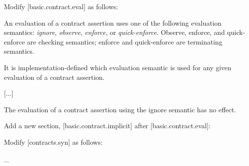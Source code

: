 Modify [basic.contract.eval] as follows:

\begin{adjustwidth}{0.5cm}{0.5cm}
An evaluation of a contract assertion uses one of the following  evaluation semantics: 
\emph{ignore}, 
\emph{observe}, 
\emph{enforce}, or 
\emph{quick-enforce}. 
Observe, enforce, and quick-enforce are checking semantics; enforce and quick-enforce are terminating semantics.

It is implementation-defined which evaluation semantic is used for any given evaluation of a contract assertion.  


[...]

The evaluation of a contract assertion using the ignore  semantic has no effect. 


\end{adjustwidth}

Add a new section, [basic.contract.implicit] after [basic.contract.eval]:

\begin{adjustwidth}{0.5cm}{0.5cm}

\end{adjustwidth}

Modify [contracts.syn] as follows:
\begin{adjustwidth}{0.5cm}{0.5cm}
_ \\
 \\
 \\
\added{\tcode{,}} \\
 \\
\tcode{\};}
\end{adjustwidth}

